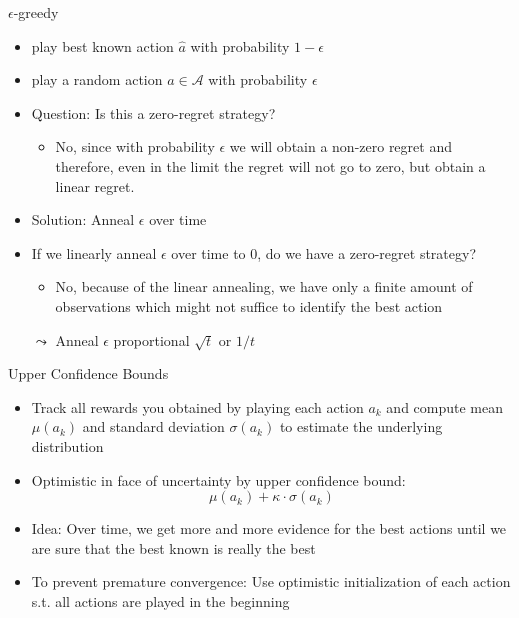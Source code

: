 \begin{frame}[c]{$\epsilon$-greedy}
	
	\begin{itemize}
		\item play best known action $\hat{a}$ with probability $1-\epsilon$
		\item play a random action $a \in \mathcal{A}$ with probability $\epsilon$ 
		\smallskip
		\item Question: Is this a zero-regret strategy?
		\pause
		\begin{itemize}
			\item No, since with probability $\epsilon$ we will obtain a non-zero regret and therefore, even in the limit the regret will not go to zero, but obtain a linear regret.
		\end{itemize}
		\smallskip\pause
		\item Solution: Anneal $\epsilon$ over time
		\item If we linearly anneal $\epsilon$ over time to $0$, do we have a zero-regret strategy?
		\pause
		\begin{itemize}
			\item No, because of the linear annealing, we have only a finite amount of observations which might not suffice to identify the best action
		\end{itemize}
		\smallskip
		\item[$\leadsto$] Anneal $\epsilon$ proportional $\sqrt{t}$ or $1/t$
	\end{itemize}
	
\end{frame}
\begin{frame}[c]{Upper Confidence Bounds}
	
	\begin{itemize}
		\item Track all rewards you obtained by playing each action $a_k$ and compute mean $\mu(a_k)$ and standard deviation $\sigma(a_k)$ to estimate the underlying distribution
		\item Optimistic in face of uncertainty by upper confidence bound:
		$$\mu(a_k) + \kappa \cdot \sigma(a_k)$$
		\item Idea: Over time, we get more and more evidence for the best actions until we are sure that the best known is really the best
		\medskip
		\pause
		\item To prevent premature convergence: Use optimistic initialization of each action s.t. all actions are played in the beginning
	\end{itemize}
	
\end{frame}
